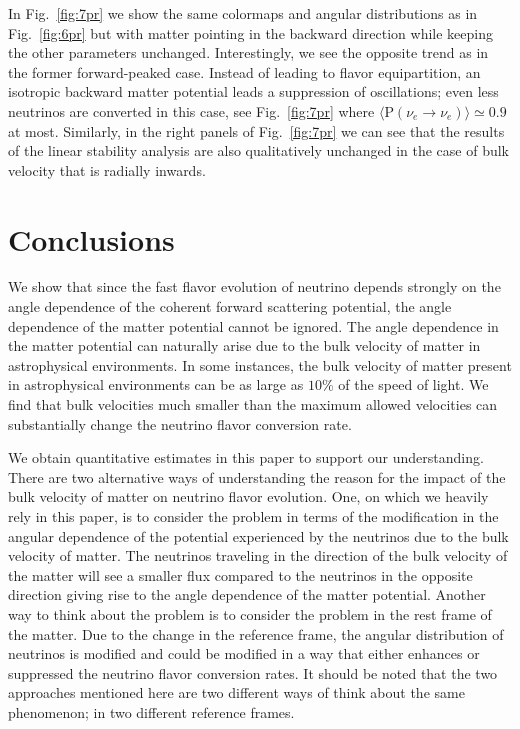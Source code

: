 \documentclass[aps, prd, 10pt, twocolumn, superscriptaddress, noshowpacs, preprintnumbers, longbibliography, groupedaddress, footinbib, bibnotes]{revtex4-1}
\begin{document}
In Fig.~\ref{fig:7pr} we show the same colormaps and angular distributions as in Fig.~\ref{fig:6pr} but with matter pointing in the backward direction while keeping the other parameters unchanged. Interestingly, we see the opposite trend as in the former forward-peaked case. Instead of leading to flavor equipartition, an isotropic backward matter potential leads a suppression of oscillations; even less neutrinos are converted in this case, see Fig.~\ref{fig:7pr} where $\langle \mathrm{P}(\nu_{e}\rightarrow \nu_{e}) \rangle \simeq 0.9$ at most. Similarly, in the right panels of Fig.~\ref{fig:7pr} we can see that the results of the linear stability analysis are also qualitatively unchanged in the case of bulk velocity that is radially inwards.






\section{Conclusions}
\label{sec:conclusion} 


We show that since the fast flavor evolution of neutrino depends strongly on the angle dependence of the coherent forward scattering potential, the angle dependence of the matter potential cannot be ignored. The angle dependence in the matter potential can naturally arise due to the bulk velocity of matter in astrophysical environments. In some instances, the bulk velocity of matter present in astrophysical environments can be as large as $10\%$ of the speed of light. We find that bulk velocities much smaller than the maximum allowed velocities can substantially change the neutrino flavor conversion rate. 

We obtain quantitative estimates in this paper to support our understanding. There are two alternative ways of understanding the reason for the impact of the bulk velocity of matter on neutrino flavor evolution. One, on which we heavily rely in this paper, is to consider the problem in terms of the modification in the angular dependence of the potential experienced by the neutrinos due to the bulk velocity of matter. The neutrinos traveling in the direction of the bulk velocity of the matter will see a smaller flux compared to the neutrinos in the opposite direction giving rise to the angle dependence of the matter potential.
Another way to think about the problem is to consider the problem in the rest frame of the matter. Due to the change in the reference frame, the angular distribution of neutrinos is modified and could be modified in a way that either enhances or suppressed the neutrino flavor conversion rates. It should be noted that the two approaches mentioned here are two different ways of think about the same phenomenon; in two different reference frames.
\end{document}
